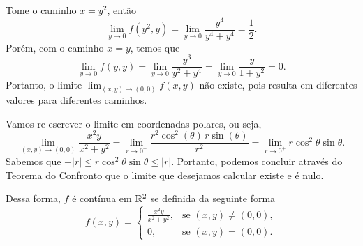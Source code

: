 
\begin{questions}

\setcounter{question}{1}
\begin{solution}
    Tome o caminho $x = y^2$, então
    \[
        \lim_{y\to 0} f(y^2,y) = \lim_{y\to 0} \frac{y^4}{y^4+y^4} = \frac{1}{2}.
    \]
    Porém, com o caminho $x=y$, temos que
    \[
        \lim_{y\to 0} f(y,y) = \lim_{y\to 0} \frac{y^3}{y^2+y^4} = \lim_{y\to 0} \frac{y}{1+y^2} = 0.
    \]
    Portanto, o limite $\displaystyle\lim_{(x,y) \to (0,0)} f(x,y)$ não existe, pois resulta em diferentes valores para diferentes caminhos.
\end{solution}


\begin{solution}
    Vamos re-escrever o limite em coordenadas polares, ou seja,
    \[
        \lim_{(x,y) \to (0,0)} \frac{x^2 y}{x^2 + y^2}
            = \lim_{r \to 0^+} \frac{r^2\cos^2(\theta)\,r \sin(\theta)}{r^2}
            = \lim_{r \to 0^+} r \cos^2\theta \sin \theta.
    \]
    Sabemos que
    $
    -|r| \le r \cos^2\theta \sin \theta \le |r|.
    $
    Portanto, podemos concluir através do Teorema do Confronto que o limite que desejamos calcular existe e é nulo.
    
    Dessa forma, $f$ é contínua em ${\mathbb R}^2$ se definida da seguinte forma
    \[
    f(x,y) =
    \begin{cases}
        \frac{x^2 y}{x^2 + y^2}, &\text{se }(x,y)\neq(0,0),\\
        0,  &\text{se }(x,y)=(0,0).
    \end{cases}
    \]
\end{solution}

\setcounter{question}{6}


\end{questions}
